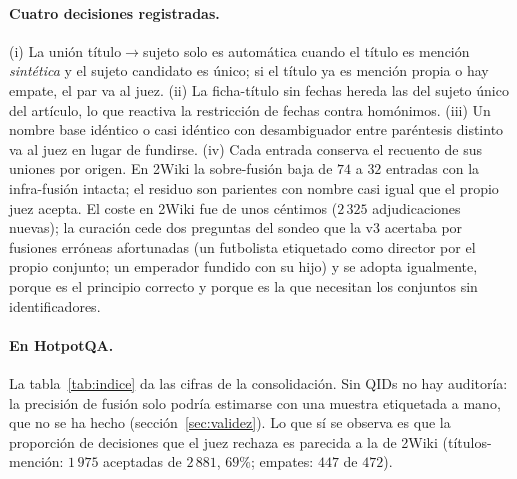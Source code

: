 \documentclass[11pt,a4paper]{article}
\begin{document}
\paragraph{Cuatro decisiones registradas.}
(i) La unión título$\to$sujeto solo es automática cuando el título es
mención \emph{sintética} y el sujeto candidato es único; si el título ya es
mención propia o hay empate, el par va al juez. (ii) La ficha-título sin
fechas hereda las del sujeto único del artículo, lo que reactiva la
restricción de fechas contra homónimos. (iii) Un nombre base idéntico o casi
idéntico con desambiguador entre paréntesis distinto va al juez en lugar de
fundirse. (iv) Cada entrada conserva el recuento de sus uniones por origen.
En 2Wiki la sobre-fusión baja de $74$ a $32$ entradas con la infra-fusión
intacta; el residuo son parientes con nombre casi igual que el propio juez
acepta. El coste en 2Wiki fue de unos céntimos ($2\,325$ adjudicaciones
nuevas); la curación cede dos preguntas del sondeo que la v3 acertaba por
fusiones erróneas afortunadas (un futbolista etiquetado como director por el
propio conjunto; un emperador fundido con su hijo) y se adopta igualmente,
porque es el principio correcto y porque es la que necesitan los conjuntos
sin identificadores.

\paragraph{En HotpotQA.}
La tabla~\ref{tab:indice} da las cifras de la consolidación. Sin QIDs no
hay auditoría: la precisión de fusión solo podría estimarse con una muestra
etiquetada a mano, que no se ha hecho (sección~\ref{sec:validez}). Lo que sí
se observa es que la proporción de decisiones que el juez rechaza es
parecida a la de 2Wiki (títulos-mención: $1\,975$ aceptadas de $2\,881$,
$69\%$; empates: $447$ de $472$).
\end{document}

